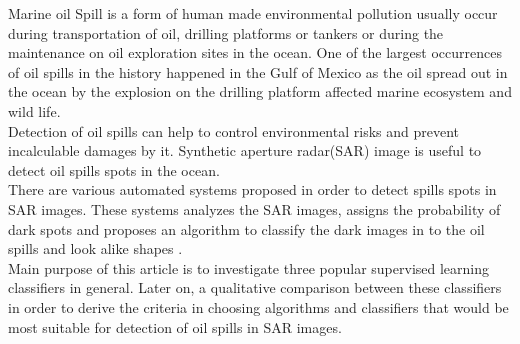 Marine oil Spill is a form of human made environmental pollution usually occur during transportation of oil, drilling platforms or tankers \cite{Zhang201476}or during the maintenance on oil exploration sites in the ocean. One of the largest occurrences of oil spills in the history happened in the Gulf of Mexico as the oil spread out in the ocean by the explosion on the drilling platform affected marine ecosystem and wild life\cite{Bozeman2011244}.\\
Detection of oil spills can help to control environmental risks and prevent incalculable damages by it. Synthetic aperture radar(SAR) image is useful to detect oil spills spots in the ocean. \\
There are various automated systems proposed in order to detect spills spots in SAR images. These systems analyzes the SAR images, assigns the probability of dark spots and proposes an algorithm to classify the dark images in to the oil spills and look alike shapes \cite{Xu201414,brekke2008classifiers,Keramitsoglou2006640,Guo2014146}.\\
Main purpose of this article is to  investigate three popular supervised learning classifiers in general. Later on, a qualitative comparison between these classifiers in order to derive the criteria in choosing algorithms and classifiers that would be most suitable for detection of oil spills in SAR images. 